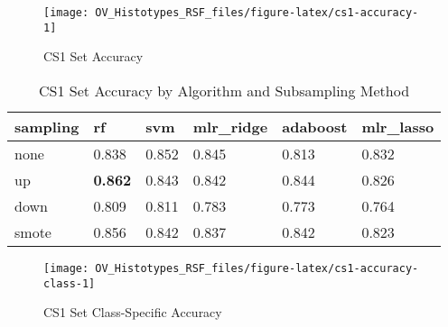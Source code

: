\documentclass[
]{report}
\begin{document}
\begin{figure}[H]

{\centering \texttt{[image: OV\_Histotypes\_RSF\_files/figure-latex/cs1-accuracy-1]} 

}

\caption{CS1 Set Accuracy}\label{fig:cs1-accuracy}
\end{figure}

\begin{table}

\caption{\label{tab:cs1-accuracy-table}CS1 Set Accuracy by Algorithm and Subsampling Method}
\centering
\begin{tabular}[t]{l|l|l|l|l|l}
\hline
sampling & rf & svm & mlr\_ridge & adaboost & mlr\_lasso\\
\hline
none & 0.838 & 0.852 & 0.845 & 0.813 & 0.832\\
\hline
up & \textbf{0.862} & 0.843 & 0.842 & 0.844 & 0.826\\
\hline
down & 0.809 & 0.811 & 0.783 & 0.773 & 0.764\\
\hline
smote & 0.856 & 0.842 & 0.837 & 0.842 & 0.823\\
\hline
\end{tabular}
\end{table}

\begin{figure}[H]

{\centering \texttt{[image: OV\_Histotypes\_RSF\_files/figure-latex/cs1-accuracy-class-1]} 

}

\caption{CS1 Set Class-Specific Accuracy}\label{fig:cs1-accuracy-class}
\end{figure}
\end{document}
